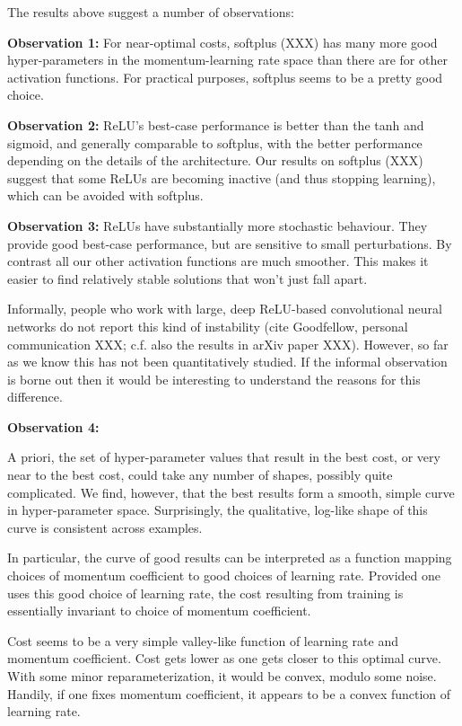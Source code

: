 \documentclass[10pt]{article}
\begin{document}
The results above suggest a number of observations:

\textbf{Observation 1:} For near-optimal costs, softplus (XXX) has
many more good hyper-parameters in the momentum-learning rate space
than there are for other activation functions.  For practical
purposes, softplus seems to be a pretty good choice.

\textbf{Observation 2:} ReLU's best-case performance is better than
the tanh and sigmoid, and generally comparable to softplus, with the
better performance depending on the details of the architecture.  Our
results on softplus (XXX) suggest that some ReLUs are becoming
inactive (and thus stopping learning), which can be avoided with
softplus.

\textbf{Observation 3:} ReLUs have substantially more stochastic
behaviour.  They provide good best-case performance, but are sensitive
to small perturbations.  By contrast all our other activation
functions are much smoother.  This makes it easier to find relatively
stable solutions that won't just fall apart.  

Informally, people who work with large, deep ReLU-based convolutional
neural networks do not report this kind of instability (cite
Goodfellow, personal communication XXX; c.f. also the results in arXiv
paper XXX).  However, so far as we know this has not been
quantitatively studied.  If the informal observation is borne out then
it would be interesting to understand the reasons for this difference.

\textbf{Observation 4:} 


A priori, the set of hyper-parameter values that result in the best
cost, or very near to the best cost, could take any number of shapes,
possibly quite complicated. We find, however, that the best results
form a smooth, simple curve in hyper-parameter space.  Surprisingly,
the qualitative, log-like shape of this curve is consistent across
examples.

In particular, the curve of good results can be interpreted as a
function mapping choices of momentum coefficient to good choices of
learning rate. Provided one uses this good choice of learning rate,
the cost resulting from training is essentially invariant to choice of
momentum coefficient.

Cost seems to be a very simple valley-like function of learning rate
and momentum coefficient. Cost gets lower as one gets closer to this
optimal curve. With some minor reparameterization, it would be convex,
modulo some noise. Handily, if one fixes momentum coefficient, it
appears to be a convex function of learning rate.
\end{document}
